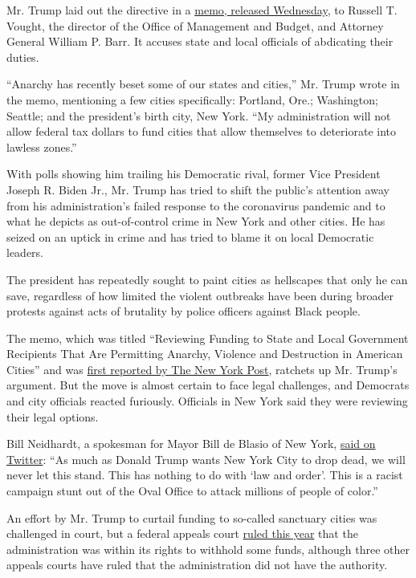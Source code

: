 Mr. Trump laid out the directive in a
\href{https://www.whitehouse.gov/presidential-actions/memorandum-reviewing-funding-state-local-government-recipients-permitting-anarchy-violence-destruction-american-cities/}{memo,
released Wednesday}, to Russell T. Vought, the director of the Office of
Management and Budget, and Attorney General William P. Barr. It accuses
state and local officials of abdicating their duties.

``Anarchy has recently beset some of our states and cities,'' Mr. Trump
wrote in the memo, mentioning a few cities specifically: Portland, Ore.;
Washington; Seattle; and the president's birth city, New York. ``My
administration will not allow federal tax dollars to fund cities that
allow themselves to deteriorate into lawless zones.''

With polls showing him trailing his Democratic rival, former Vice
President Joseph R. Biden Jr., Mr. Trump has tried to shift the public's
attention away from his administration's failed response to the
coronavirus pandemic and to what he depicts as out-of-control crime in
New York and other cities. He has seized on an uptick in crime and has
tried to blame it on local Democratic leaders.

The president has repeatedly sought to paint cities as hellscapes that
only he can save, regardless of how limited the violent outbreaks have
been during broader protests against acts of brutality by police
officers against Black people.

The memo, which was titled ``Reviewing Funding to State and Local
Government Recipients That Are Permitting Anarchy, Violence and
Destruction in American Cities'' and was
\href{https://nypost.com/2020/09/02/trump-orders-review-to-defund-nyc-other-anarchist-cities/}{first
reported by The New York Post}, ratchets up Mr. Trump's argument. But
the move is almost certain to face legal challenges, and Democrats and
city officials reacted furiously. Officials in New York said they were
reviewing their legal options.

Bill Neidhardt, a spokesman for Mayor Bill de Blasio of New York,
\href{https://twitter.com/BNeidhardt/status/1301297945095155719?s=20}{said
on Twitter}: ``As much as Donald Trump wants New York City to drop dead,
we will never let this stand. This has nothing to do with `law and
order'. This is a racist campaign stunt out of the Oval Office to attack
millions of people of color.''

An effort by Mr. Trump to curtail funding to so-called sanctuary cities
was challenged in court, but a federal appeals court
\href{https://www.nbcnews.com/politics/immigration/court-rules-trump-administration-can-withhold-grants-sanctuary-cities-n1143511}{ruled
this year} that the administration was within its rights to withhold
some funds, although three other appeals courts have ruled that the
administration did not have the authority.

